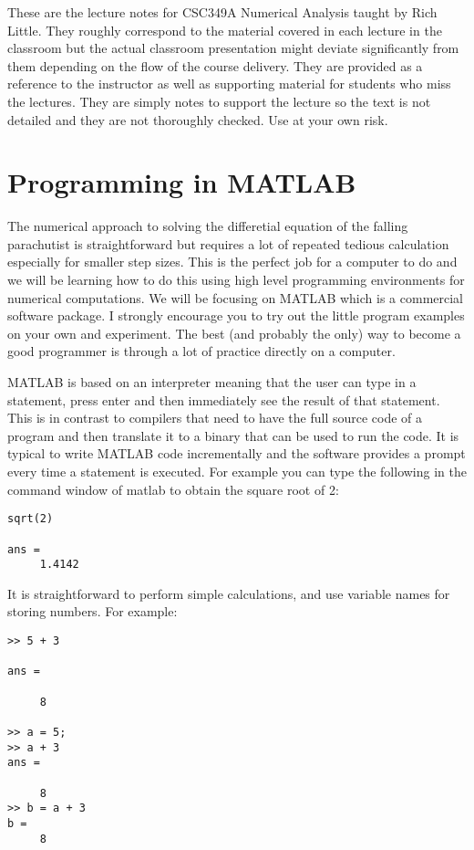\documentclass [titlepage,12pt,letter] {article}
\begin{document}
 


These are the lecture notes for CSC349A Numerical Analysis taught by
Rich Little. They roughly correspond to
the material covered in each lecture in the classroom but the actual
classroom presentation might deviate significantly from them depending
on the flow of the course delivery. They are provided as a reference to
the instructor as well as supporting material for students who miss
the lectures. They are simply notes to support the lecture so the text
is not detailed and they are not thoroughly checked. Use at your own
risk.



\section{Programming in MATLAB} 

The numerical approach to solving the differetial equation of the
falling parachutist is straightforward but requires a lot of repeated
tedious calculation especially for smaller step sizes. This is the
perfect job for a computer to do and we will be learning how to do
this using high level programming environments for numerical
computations.  We will be focusing on MATLAB which is a
commercial software package. I strongly encourage
you to try out the little program examples on your own and
experiment. The best (and probably the only) way to become a good
programmer is through a lot of practice directly on a computer. 

MATLAB is based on an interpreter meaning that the user can type
in a statement, press enter and then immediately see the result of
that statement. This is in contrast to compilers that need to have the
full source code of a program and then translate it to a binary that
can be used to run the code.  It is typical to write MATLAB code
incrementally and the software provides a prompt every time a
statement is executed. For example you can type the following in the
command window of matlab to obtain the square root of 2:

\begin{verbatim} 
sqrt(2) 

ans = 
     1.4142
\end{verbatim} 

It is straightforward to perform simple calculations, and use variable
names for storing numbers. For example: 

\begin{verbatim} 
>> 5 + 3 

ans =

     8

>> a = 5; 
>> a + 3
ans =

     8
>> b = a + 3 
b = 
     8
\end{verbatim} 
\end{document}
